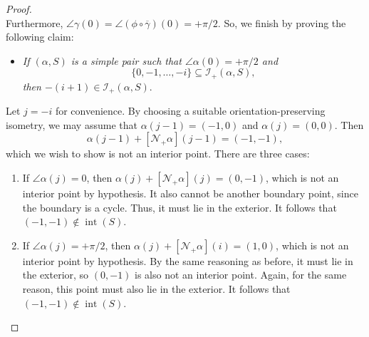 \begin{proof}
\begin{equation}
  \end{equation}
  Furthermore, $\angle \gamma (0) = \angle (\phi \circ \overline{\gamma}) (0) = +\pi/2$. So, we finish by proving the following claim:
  \begin{itemize}
    \item[(\star)] \emph{If $(\alpha, S)$ is a simple pair such that $\angle \alpha (0) = +\pi/2$ and}
    \begin{equation}
      \{ 0, -1, \ldots, -i \} \subseteq \mathcal{I}_{+}(\alpha, S),
    \end{equation}
    \emph{then $-(i+1) \in \mathcal{I}_{+}(\alpha, S)$}.
  \end{itemize}
  Let $j = -i$ for convenience.
  By choosing a suitable orientation-preserving isometry, we may assume that $\alpha(j-1) = (-1, 0)$ and $\alpha(j) = (0, 0)$. Then 
  \begin{equation}
    \alpha(j-1) + [\mathcal{N}_+\alpha](j-1) = (-1, -1),
  \end{equation}
  which we wish to show is not an interior point. There are three cases:
  \begin{enumerate}
    \item If $\angle \alpha (j) = 0$, then $\alpha(j) + [\mathcal{N}_+\alpha](j) = (0, -1)$, which is not an interior point by hypothesis.
    It also cannot be another boundary point, since the boundary is a cycle.
    Thus, it must lie in the exterior.
    It follows that $(-1, -1) \not\in \operatorname{int}(S)$.

    \item If $\angle \alpha (j) = +\pi/2$, then $\alpha(j) + [\mathcal{N}_+\alpha](i) = (1, 0)$, which is not an interior point by hypothesis.
    By the same reasoning as before, it must lie in the exterior, so $(0, -1)$ is also not an interior point. 
    Again, for the same reason, this point must also lie in the exterior.
    It follows that $(-1, -1) \not\in \operatorname{int}(S)$.


\end{enumerate}
\end{proof}
